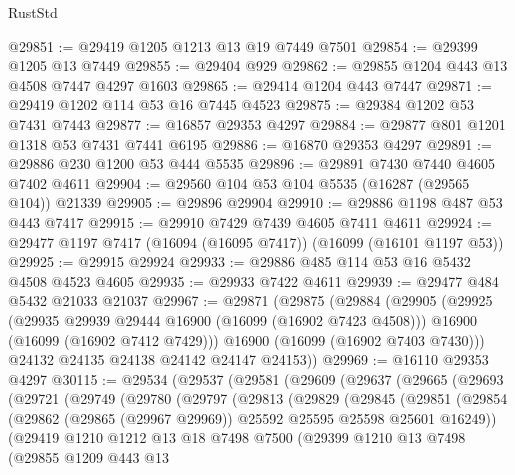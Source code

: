 \begin{lexlean}{RustStd}
\begin{coremodule}
@29851 := @29419 @1205 @1213 @13 @19 @7449 @7501
@29854 := @29399 @1205 @13 @7449
@29855 := @29404 @929
@29862 := @29855 @1204 @443 @13 @4508 @7447 @4297 @1603
@29865 := @29414 @1204 @443 @7447
@29871 := @29419 @1202 @114 @53 @16 @7445 @4523
@29875 := @29384 @1202 @53 @7431 @7443
@29877 := @16857 @29353 @4297
@29884 := @29877 @801 @1201 @1318 @53 @7431 @7441 @6195
@29886 := @16870 @29353 @4297
@29891 := @29886 @230 @1200 @53 @444 @5535
@29896 := @29891 @7430 @7440 @4605 @7402 @4611
@29904 := @29560 @104 @53 @104 @5535 (@16287 (@29565 @104)) @21339
@29905 := @29896 @29904
@29910 := @29886 @1198 @487 @53 @443 @7417
@29915 := @29910 @7429 @7439 @4605 @7411 @4611
@29924 := @29477 @1197 @7417 (@16094 (@16095 @7417)) (@16099 (@16101 @1197 @53))
@29925 := @29915 @29924
@29933 := @29886 @485 @114 @53 @16 @5432 @4508 @4523 @4605
@29935 := @29933 @7422 @4611
@29939 := @29477 @484 @5432 @21033 @21037
@29967 := @29871
    (@29875
      (@29884
        (@29905
          (@29925
            (@29935 @29939 @29444 @16900 (@16099 (@16902 @7423 @4508)))
            @16900
            (@16099 (@16902 @7412 @7429)))
          @16900
          (@16099 (@16902 @7403 @7430)))
        @24132
        @24135
        @24138
        @24142
        @24147
        @24153))
@29969 := @16110 @29353 @4297
@30115 := @29534
    (@29537
      (@29581
        (@29609
          (@29637
            (@29665
              (@29693
                (@29721
                  (@29749
                    (@29780
                      (@29797
                        (@29813
                          (@29829
                            (@29845
                              (@29851
                                (@29854
                                  (@29862
                                    (@29865 (@29967 @29969))
                                    @25592
                                    @25595
                                    @25598
                                    @25601
                                    @16249))
                                (@29419
                                  @1210
                                  @1212
                                  @13
                                  @18
                                  @7498
                                  @7500
                                  (@29399
                                    @1210
                                    @13
                                    @7498
                                    (@29855
                                      @1209
                                      @443
                                      @13

\end{coremodule}
\end{lexlean}
